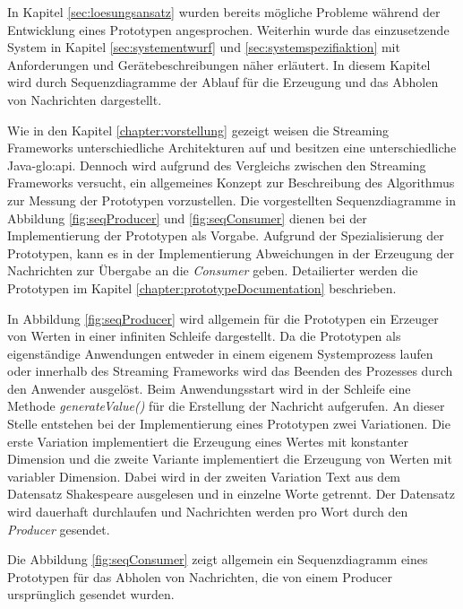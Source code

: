 In Kapitel \ref{sec:loesungsansatz} wurden bereits mögliche Probleme während der Entwicklung eines Prototypen angesprochen. Weiterhin wurde das einzusetzende System in Kapitel \ref{sec:systementwurf} und \ref{sec:systemspezifiaktion} mit Anforderungen und Gerätebeschreibungen näher erläutert. In diesem Kapitel wird durch Sequenzdiagramme der Ablauf für die Erzeugung und das Abholen von Nachrichten dargestellt.

Wie in den Kapitel \ref{chapter:vorstellung} gezeigt weisen die Streaming Frameworks unterschiedliche Architekturen auf und besitzen eine unterschiedliche Java-\gls{glo:api}. Dennoch wird aufgrund des Vergleichs zwischen den Streaming Frameworks versucht, ein allgemeines Konzept zur Beschreibung des Algorithmus zur Messung der Prototypen vorzustellen. Die vorgestellten Sequenzdiagramme in Abbildung \ref{fig:seqProducer} und \ref{fig:seqConsumer} dienen bei der Implementierung der Prototypen als Vorgabe. Aufgrund der Spezialisierung der Prototypen, kann es in der Implementierung Abweichungen in der Erzeugung der Nachrichten zur Übergabe an die \textit{Consumer} geben. Detailierter werden die Prototypen im Kapitel \ref{chapter:prototypeDocumentation} beschrieben.

In Abbildung \ref{fig:seqProducer} wird allgemein für die Prototypen ein Erzeuger von Werten in einer infiniten Schleife dargestellt. Da die Prototypen als eigenständige Anwendungen entweder in einem eigenem Systemprozess laufen oder innerhalb des Streaming Frameworks wird das Beenden des Prozesses durch den Anwender ausgelöst. Beim Anwendungsstart wird in der Schleife eine Methode \textit{generateValue()} für die Erstellung der Nachricht aufgerufen. An dieser Stelle entstehen bei der Implementierung eines Prototypen zwei Variationen. Die erste Variation implementiert die Erzeugung eines Wertes mit konstanter Dimension und die zweite Variante implementiert die Erzeugung von Werten mit variabler Dimension.  Dabei wird in der zweiten Variation Text aus dem Datensatz Shakespeare  ausgelesen und in einzelne Worte getrennt. Der Datensatz wird dauerhaft durchlaufen und Nachrichten werden pro Wort durch den \textit{Producer} gesendet.

Die Abbildung \ref{fig:seqConsumer} zeigt allgemein ein Sequenzdiagramm eines Prototypen für das Abholen von Nachrichten, die von einem Producer ursprünglich gesendet wurden.



